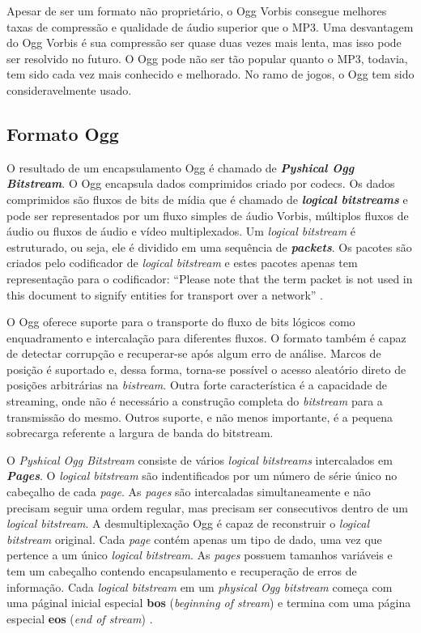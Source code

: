 Apesar de ser um formato não proprietário, o Ogg Vorbis consegue melhores taxas de compressão e qualidade de áudio superior que o MP3. Uma desvantagem do Ogg Vorbis é sua compressão ser quase duas vezes mais lenta, mas isso pode ser resolvido no futuro. O Ogg pode não ser tão popular quanto o MP3, todavia, tem sido cada vez mais conhecido e melhorado. No ramo de jogos, o Ogg tem sido consideravelmente usado.


\subsection{Formato Ogg}

O resultado de um encapsulamento Ogg é chamado de \textbf{\textit{Pyshical Ogg Bitstream}}. O Ogg encapsula dados comprimidos criado por codecs. Os dados comprimidos são fluxos de bits de mídia que é chamado de \textbf{\textit{logical bitstreams}} e pode ser representados por um fluxo simples de áudio Vorbis, múltiplos fluxos de áudio ou fluxos de áudio e vídeo multiplexados. Um \textit{logical bitstream} é estruturado, ou seja, ele é dividido em uma sequência de \textbf{\textit{packets}}. Os pacotes são criados pelo codificador de \textit{logical bitstream} e estes pacotes apenas tem representação para o codificador: ``Please note that the term packet is not used in this document to signify entities for transport over a network'' \cite{ogg}.

O Ogg oferece suporte para o transporte do fluxo de bits lógicos como enquadramento e intercalação para diferentes fluxos. O formato também é capaz de detectar corrupção e recuperar-se após algum erro de análise. Marcos de posição é suportado e, dessa forma, torna-se possível o acesso aleatório direto de posições arbitrárias na \textit{bistream}. Outra forte característica é a capacidade de streaming, onde não é necessário a construção completa do \textit{bitstream} para a transmissão do mesmo. Outros suporte, e não menos importante, é a pequena sobrecarga referente a largura de banda do bitstream.

O \textit{Pyshical Ogg Bitstream} consiste de vários \textit{logical bitstreams} intercalados em \textbf{\textit{Pages}}. O \textit{logical bitstream}  são indentificados por um número de série único no cabeçalho de cada \textit{page}. As \textit{pages} são intercaladas simultaneamente e não precisam seguir uma ordem regular, mas precisam ser consecutivos dentro de um \textit{logical bitstream}. A desmultiplexação Ogg é capaz de reconstruir o \textit{logical bitstream} original. Cada \textit{page} contém apenas um tipo de dado, uma vez que pertence a um único \textit{logical bitstream}. As \textit{pages} possuem tamanhos variáveis e tem um cabeçalho contendo encapsulamento e recuperação de erros de informação. Cada \textit{logical bitstream} em um \textit{physical Ogg bitstream} começa com uma páginal inicial especial \textbf{bos} (\textit{beginning of stream}) e termina com uma página especial \textbf{eos} (\textit{end of stream}) \cite{ogg}.


